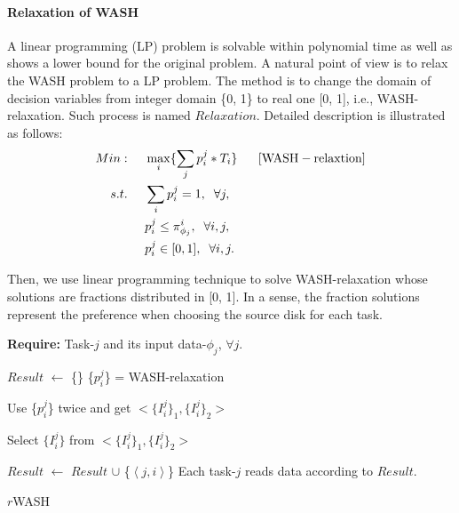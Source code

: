 \documentclass[conference]{IEEEtran}
\begin{document}
\paragraph{\textbf{Relaxation of WASH}} A linear programming (LP) problem is solvable within polynomial time as well as shows a lower bound for the original problem. A natural point of view is to relax the WASH problem to a LP problem. The method is to change the domain of decision variables from integer domain \{0, 1\} to real one [0, 1], i.e., WASH-relaxation. Such process is named $Relaxation$. Detailed description is illustrated as follows: 
\vspace{-0.2cm}
 \begin{align}
 Min:&\;\;\;\;\;\max\limits_{i}\{\sum_{j}p_i^j*T_i\}\;\;\;\;\;\;[\rm{WASH-relaxtion}]\nonumber\\
 s.t. 
 &\;\;\;\;\;\sum_{i}p_i^j = 1,\;\;\forall j,\nonumber\\
 &\;\;\;\;\;p_i^j \leq \pi_{\phi_j}^{i},\;\;\forall i,j,\nonumber\\
 &\;\;\;\;\;p_i^j \in[0, 1],\;\;\forall i,j.\nonumber
 \end{align}

Then, we use linear programming technique to solve WASH-relaxation whose solutions are fractions distributed in [0, 1]. In a sense, the fraction solutions represent the preference when choosing the source disk for each task. 

 \begin{algorithm}[!t]
 	\textbf{Require:} Task-$j$ and its input data-$\phi_j$, $\forall j$. %
 	\begin{algorithmic}[1]	
 		\State $Result$ $\gets$ \{\}
 		\State \{$p_i^j$\} = WASH-relaxation		
 		
 		
 		\State Use \{$p_i^j$\} twice and get $<\{I_i^j\}_1, \{I_i^j\}_2 >$
 		
		\State Select $\{I_i^j\}$ from $<\{I_i^j\}_1, \{I_i^j\}_2>$


 			\State $Result$ $\gets$ $Result$ $\cup$ 	
 			\{$\left \langle j, i\right \rangle$\}
 			\EndIf
 		\EndFor	
 		\State Each task-$j$ reads data according to $Result$.
 	\end{algorithmic}
 	\caption{$r$WASH}\label{WASH-rdm}
 \end{algorithm}
\end{document}
